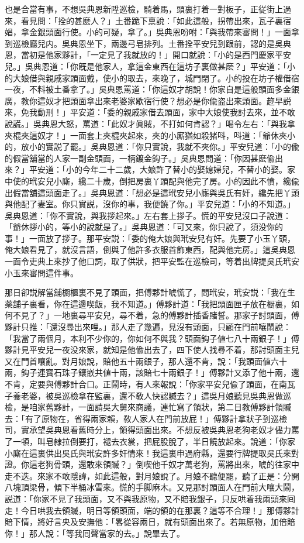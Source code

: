 也是合當有事，不想吳典恩新陞巡檢，騎着馬，頭裏打着一對板子，正従街上過來，看見問：「拴的甚麽人？」土番跪下禀說：「如此這般，拐帶出來，瓦子裏宿娼，拿金銀頭面行使。小的可疑，拿了。」吳典恩吩咐：「與我帶來審問！」一面拿到巡檢廳兒内。吳典恩坐下，兩邊弓皂排列。土番拴平安兒到跟前，認的是吳典恩，當初是他家夥計，「一定見了我就放的！」開口就說：「小的是西門慶家平安兒。」吳典恩道：「你旣是他家人，拿這金東西在這坊子裏做甚麽？」平安道：「小的大娘借與親戚家頭面戴，使小的取去，來晚了，城門閉了。小的投在坊子權借宿一夜，不料被土番拿了。」吳典恩罵道：「你這奴才胡說！你家自是這般頭面多金銀廣，教你這奴才把頭面拿出來老婆家歇宿行使？想必是你偸盗出來頭面。趂早説來，免我動刑！」平安道：「委的親戚家借去頭面，家中大娘使我討去來，並不敢說謊。」吳典恩大怒，罵道：「此奴才眞賊，不打如何肯認？」喝令左右：「與我拿夾棍夾這奴才！」一面套上夾棍夾起來，夾的小廝猶如殺猪呌，呌道：「爺休夾小的，放小的實説了罷。」吳典恩道：「你只實說，我就不夾你。」平安兒道：「小的偸的假當舖當的人家一副金頭面，一柄鍍金鈎子。」吳典恩問道：「你因甚麽偸出來？」平安道：「小的今年二十二歲，大娘許了替小的娶媳婦兒，不替小的娶。家中使的玳安兒小廝，纔二十歲，倒把房裏丫頭配與他完了房。小的因此不憤，纔偸出假當舖這頭面走了。」吳典恩道：「想必是這玳安兒小廝與吳氏有奸，纔先把丫頭與他配了妻室。你只實説，沒你的事，我便饒了你。」平安兒道：「小的不知道。」吳典恩道：「你不實說，與我拶起來。」左右套上拶子。慌的平安兒沒口子說道：「爺休拶小的，等小的說就是了。」吳典恩道：「可又來，你只說了，須没你的事！」一面放了拶子。那平安説：「委的俺大娘與玳安兒有奸。先要了小玉丫頭，俺大娘看見了，就沒言語，倒與了他許多衣服首飾東西，配與他完房。」這吳典恩一面令吏典上來抄了他口詞，取了供狀，把平安監在巡檢司，等着出牌提吳氏玳安小玉來審問這件事。

那日卻説解當舖橱櫃裏不見了頭面，把傅夥計唬慌了，問玳安，玳安説：「我在生薬舖子裏看，你在這邊喫飯，我不知道。」傅夥計道：「我把頭面匣子放在橱裏，如何不見了？」一地裏尋平安兒，尋不着，急的傅夥計插香賭誓。那家子討頭面，傅夥計只推：「還沒尋出來哩。」那人走了幾遍，見沒有頭面，只顧在門前嚷鬧說：「我當了兩個月，本利不少你的，你如何不與我？頭面鈎子値七八十兩銀子！」傅夥計見平安兒一夜没來家，就知是他偸出去了，四下使人找尋不着，那討頭面主兒又在門首嚷亂。對月娘說，賠他五十兩銀子，那人還不肯，說：「我頭面値六十兩，鈎子連寳石珠子鑲嵌共値十兩，該賠七十兩銀子！」傅夥計又添了他十兩，還不肯，定要與傅夥計合口。正鬧時，有人來報說：「你家平安兒偸了頭面，在南瓦子養老婆，被吳巡檢拿在監裏，還不敎人快認贓去？」這吳月娘聽見吳典恩做巡檢，是咱家舊夥計，一面請吳大舅來商議，連忙寫了領狀，第二日教傅夥計領贓去：「有了原物在，省得兩家賴，敎人家人在門前放屁！」傅夥計拿狀子到巡檢司，實承望吳典恩看舊時分上，領得頭面出來。不想反被吳典恩老狗老奴才儘力罵了一頓，叫皂隸拉倒要打，褪去衣裳，把屁股脫了，半日饒放起來。說道：「你家小廝在這裏供出吳氏與玳安許多奸情來！我這裏申過府縣，還要行牌提取吳氏來對證。你這老狗骨頭，還敢來領贓？」倒喫他千奴才萬老狗，罵將出來，唬的往家中走不迭。來家不敢隱諱，如此這般，對月娘說了。月娘不聽便罷，聽了正是：分開八塊頂梁骨，傾下半桶冰雪來。慌的手脚麻木。又見那討頭面人在門前大嚷大鬧，説道：「你家不見了我頭面，又不與我原物，又不賠我銀子，只反哄着我兩頭來囘走！今日哄我去領贓，明日等領頭面，端的領的在那裏？這等不合理！」那傅夥計賠下情，將好言央及安撫他：「畧從容兩日，就有頭面出來了。若無原物，加倍賠你！」那人說：「等我囘聲當家的去。」說畢去了。

